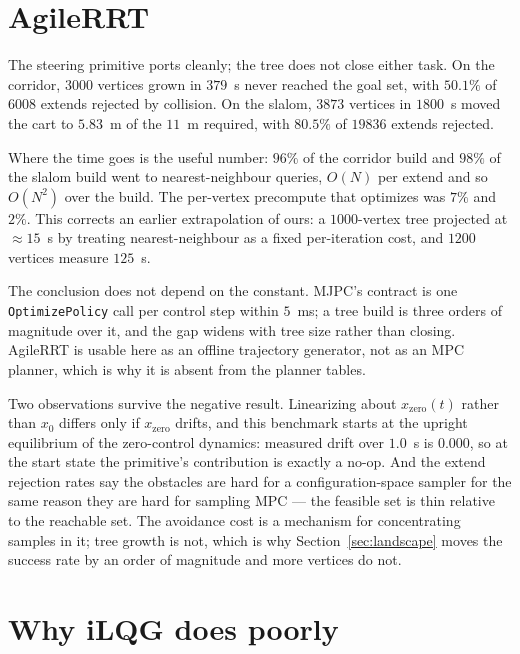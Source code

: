 \documentclass[conference]{IEEEtran}
\begin{document}
\appendices

\section{AgileRRT}
\label{app:agilerrt}

The steering primitive ports cleanly; the tree does not close either task. On
the corridor, $3000$ vertices grown in $379$~s never reached the goal set, with
$50.1\%$ of $6008$ extends rejected by collision. On the slalom, $3873$ vertices
in $1800$~s moved the cart to $5.83$~m of the $11$~m required, with $80.5\%$ of
$19836$ extends rejected.

Where the time goes is the useful number: $96\%$ of the corridor build and
$98\%$ of the slalom build went to nearest-neighbour queries, $O(N)$ per extend
and so $O(N^2)$ over the build. The per-vertex precompute that
\cite{caldwell2015} optimizes was $7\%$ and $2\%$. This corrects an earlier
extrapolation of ours: a $1000$-vertex tree projected at $\approx 15$~s by
treating nearest-neighbour as a fixed per-iteration cost, and $1200$ vertices
measure $125$~s.

The conclusion does not depend on the constant. MJPC's contract is one
\texttt{OptimizePolicy} call per control step within $5$~ms; a tree build is
three orders of magnitude over it, and the gap widens with tree size rather than
closing. AgileRRT is usable here as an offline trajectory generator, not as an
MPC planner, which is why it is absent from the planner tables.

Two observations survive the negative result. Linearizing about
$x_{\text{zero}}(t)$ rather than $x_0$ differs only if $x_{\text{zero}}$ drifts,
and this benchmark starts at the upright equilibrium of the zero-control
dynamics: measured drift over $1.0$~s is $0.000$, so at the start state the
primitive's contribution is exactly a no-op. And the extend rejection rates say
the obstacles are hard for a configuration-space sampler for the same reason
they are hard for sampling MPC --- the feasible set is thin relative to the
reachable set. The avoidance cost is a mechanism for concentrating samples in
it; tree growth is not, which is why Section~\ref{sec:landscape} moves the
success rate by an order of magnitude and more vertices do not.

\section{Why iLQG does poorly}
\label{app:ilqg}
\end{document}
